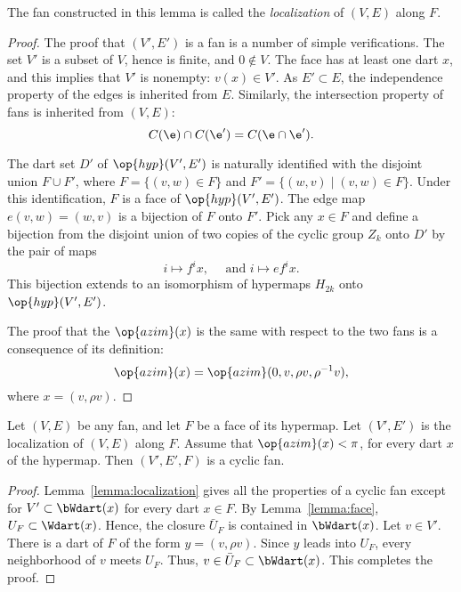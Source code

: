 \begin{definition}[localization]  The fan constructed in this lemma is called the {\it localization} of $(V,E)$ along $F$.
\end{definition}
%
%

\begin{proof}
The proof that  $(V',E')$ is a fan is a number of simple verifications.
The set $V'$ is a subset of $V$, hence is finite, and $0\not\in V$.  The face has at least one dart $x$, and this implies that $V'$ is nonempty: $v(x)\in V'$.  As $E'\subset E$, the independence property of the edges is inherited from $E$.  Similarly, the intersection property of fans is inherited from $(V,E)$:
$$
C(\e)\cap C(\e') = C(\e\cap \e').
$$

The dart set $D'$ of $\op{hyp}(V',E')$ is naturally identified with the disjoint union $F\cup F'$, where
$F = \{(v,w) \in F\}$ and $F'=\{(w,v) \mid (v,w)\in F\}$.  Under this identification, $F$ is a face of $\op{hyp}(V',E')$.  The edge map $e(v,w)= (w,v)$ is a bijection of $F$ onto $F'$.   Pick any $x\in F$ and
define a bijection from the disjoint union of two copies of the cyclic group $Z_k$ onto $D'$  by 
the pair of maps
$$
i \mapsto f^i x,\quad\text{ and } i\mapsto e f^i x.
$$
This bijection extends to an isomorphism of hypermaps $H_{2k}$ onto $\op{hyp}(V',E')$.

The proof that the $\op{azim}(x)$ is the same with respect to the two fans is a consequence of its definition:
$$
\op{azim}(x) = \op{azim}(0,v,\rho v,\rho^{-1} v),
$$
where $x = (v,\rho v)$.  
\end{proof}

\begin{lemma} 
Let $(V,E)$ be any fan, and let $F$ be a face of its hypermap.  Let $(V',E')$ is
the localization of $(V,E)$ along $F$.
Assume that $\op{azim}(x)<\pi$, for every dart $x$ of the hypermap.
Then $(V',E',F)$ is a cyclic fan. 
\end{lemma}

\begin{proof}
Lemma~\ref{lemma:localization} gives all the properties of a cyclic fan except for
$V'\subset \bWdart(x)$ for every dart
$x\in F$.    By Lemma~\ref{lemma:face},  $U_F \subset \Wdart(x)$.  Hence, the
closure $\bar U_F$ is contained in $\bWdart(x)$.  Let $v\in V'$.  There is a dart
of $F$ of the form $y=(v,\rho v)$.  Since $y$ leads into $U_F$, every neighborhood of
$v$ meets $U_F$.  Thus, $v\in \bar U_F\subset \bWdart(x)$.  This completes
the proof.
\end{proof}


